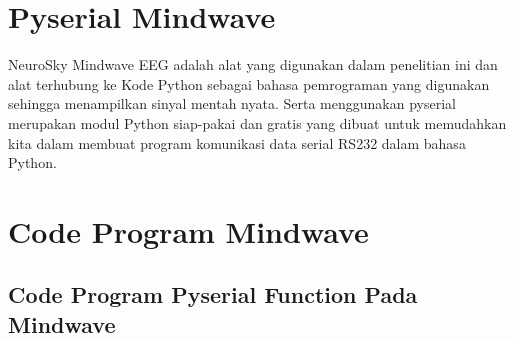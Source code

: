 \section{Pyserial Mindwave}
NeuroSky Mindwave EEG adalah alat yang digunakan dalam penelitian ini dan alat terhubung ke Kode Python sebagai bahasa pemrograman yang digunakan sehingga menampilkan sinyal mentah nyata. Serta menggunakan pyserial merupakan modul Python siap-pakai dan gratis yang dibuat untuk memudahkan kita dalam membuat program komunikasi data serial RS232 dalam bahasa Python.

\section{Code Program Mindwave}
\subsection{Code Program Pyserial Function Pada Mindwave}
